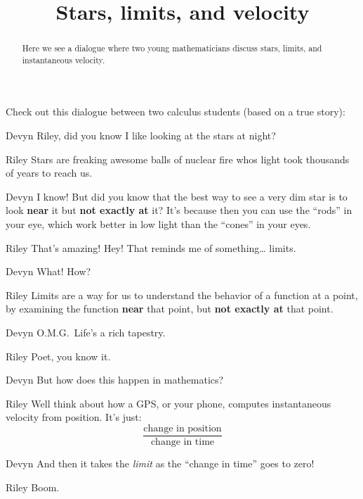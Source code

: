 \documentclass{ximera}
\title[Break-Ground:]{Stars, limits, and velocity}
\begin{document}
\begin{abstract}
Here we see a dialogue where two young mathematicians discuss stars,
limits, and instantaneous velocity.
\end{abstract}
\maketitle

Check out this dialogue between two calculus students (based on a true
story):

\begin{dialogue}
\item[Devyn] Riley, did you know I like looking at the stars at night?
\item[Riley] Stars are freaking awesome balls of nuclear fire whos
  light took thousands of years to reach us.
\item[Devyn] I know! But did you know that the best way to see a very
  dim star is to look \textbf{near} it but \textbf{not exactly at} it? It's
  because then you can use the ``rods'' in your eye, which work better
  in low light than the ``cones'' in your eyes.
\item[Riley] That's amazing! Hey! That reminds me of something\dots
  limits.
\item[Devyn] What! How?
\item[Riley] Limits are a way for us to understand the behavior of a
  function at a point, by examining the function \textbf{near} that point, but
  \textbf{not exactly at} that point.
\item[Devyn] O.M.G.\ Life's a rich tapestry.
\item[Riley] Poet, you know it.
\item[Devyn] But how does this happen in mathematics?
\item[Riley] Well think about how a GPS, or your phone, computes
  instantaneous velocity from position. It's just:
  \[
  \frac{\text{change in position}}{\text{change in time}}
  \]
\item[Devyn] And then it takes the \textit{limit} as the ``change in
  time'' goes to zero!
\item[Riley] Boom.
\end{dialogue}

\begin{problem}
\end{problem}


\end{document}
